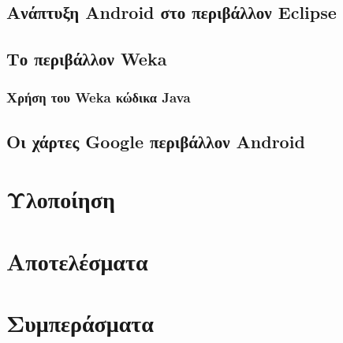 \documentclass[12pt,twoside,openright]{report}
\begin{document}
\section{Ανάπτυξη \lt Android  στο περιβάλλον \lt Eclipse\gt}
\section{Το περιβάλλον \lt Weka\gt}
\subsection{Χρήση του \lt Weka  κώδικα \lt Java\gt}
\section{Οι χάρτες \lt Google  περιβάλλον \lt Android\gt}
\chapter[Υλοποίηση]{Υλοποίηση}
\label{Chapter6}

\chapter[Αποτελέσματα]{Αποτελέσματα}
\label{Chapter6}

\chapter[Συμπεράσματα]{Συμπεράσματα}
\label{Chapter6}


 
\end{document}
